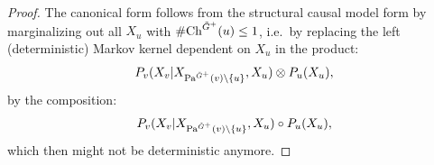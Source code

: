 \begin{proof}
    The canonical form follows from the structural causal model form 
    by marginalizing out all $X_u$ with $\#\mathrm{Ch}^{\tilde G^+}(u) \le 1$, i.e.\ by replacing the left (deterministic) 
    Markov kernel dependent on 
    $X_u$ in the product:
    \[P_v(X_v|X_{\mathrm{Pa}^{\tilde G^+}(v) \setminus \{u\}}, X_u) \otimes P_u(X_u),\]
    by the composition:
    \[P_v(X_v|X_{\mathrm{Pa}^{\tilde G^+}(v) \setminus \{u\}}, X_u) \circ P_u(X_u),\]
    which then might not be deterministic anymore.
\end{proof}

